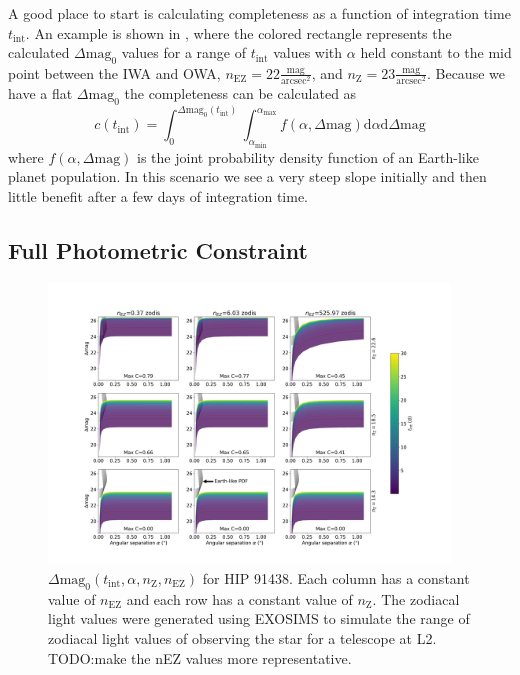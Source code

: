 A good place to start is calculating completeness
as a function of integration time $t_\textrm{int}$. An example
is shown in , where the colored rectangle
represents the calculated $\Delta\textrm{mag}_0$ values for a range of
$t_\textrm{int}$ values with $\alpha$ held constant to the mid point between
the IWA and OWA, $n_\textrm{EZ}=22 \frac{\textrm{mag}}{\textrm{arcsec}^2}$, and
$n_\textrm{Z}=23 \frac{\textrm{mag}}{\textrm{arcsec}^2}$. Because we have a
flat $\Delta\textrm{mag}_0$ the completeness can be calculated as
\begin{equation}
  c(t_\textrm{int}) = \int_{0}^{\Delta\textrm{mag}_0(t_\textrm{int})} 
  \int_{\alpha_\textrm{min}}^{\alpha_\textrm{max}} 
  f(\alpha, \Delta\textrm{mag})\textrm{d}\alpha \textrm{d}\Delta\textrm{mag}
  \label{eq:flat_comp_integral}
\end{equation}
where $f(\alpha, \Delta\textrm{mag})$ is the joint probability density function 
of an Earth-like planet population. In this scenario we see a very steep slope
initially and then little benefit after a few days of integration time.



\subsection{Full Photometric Constraint}
\label{sub:full_comp}
\begin{figure}
  \begin{center}
    \includegraphics[width=0.95\textwidth]{ch3/figures/fZ_fEZ_curves.png}
  \end{center}
  \caption{$\Delta\textrm{mag}_0(t_\textrm{int}, \alpha, n_\textrm{Z}, n_\textrm{EZ})$ for HIP 91438.
    Each column has a constant value of $n_\textrm{EZ}$ and each row has a
    constant value of $n_\textrm{Z}$. The zodiacal light values were generated
    using EXOSIMS to simulate the range of zodiacal light values of observing
  the star for a telescope at L2. TODO:make the nEZ values more representative.}
  \label{fig:fZ_fEZ_curves}
\end{figure}

